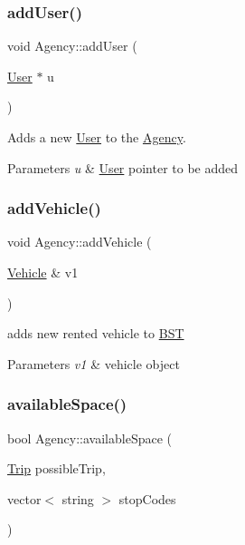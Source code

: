 \subsubsection{\texorpdfstring{add\+User()}{addUser()}}
{\footnotesize\ttfamily void Agency\+::add\+User (\begin{DoxyParamCaption}\item[{\hyperlink{class_user}{User} $\ast$}]{u }\end{DoxyParamCaption})}



Adds a new \hyperlink{class_user}{User} to the \hyperlink{class_agency}{Agency}. 


\begin{DoxyParams}{Parameters}
{\em u} & \hyperlink{class_user}{User} pointer to be added \\
\hline
\end{DoxyParams}
\mbox{\label{group___agency_gab2a08b75fbe909173d539d27a06c7bc9}} 
\subsubsection{\texorpdfstring{add\+Vehicle()}{addVehicle()}}
{\footnotesize\ttfamily void Agency\+::add\+Vehicle (\begin{DoxyParamCaption}\item[{\hyperlink{class_vehicle}{Vehicle} \&}]{v1 }\end{DoxyParamCaption})\hspace{0.3cm}{\ttfamily [inline]}}



adds new rented vehicle to \hyperlink{class_b_s_t}{B\+ST} 


\begin{DoxyParams}{Parameters}
{\em v1} & vehicle object \\
\hline
\end{DoxyParams}
\mbox{\label{group___agency_ga9defb73f53ce32bc6382843dd46fc464}} 
\subsubsection{\texorpdfstring{available\+Space()}{availableSpace()}}
{\footnotesize\ttfamily bool Agency\+::available\+Space (\begin{DoxyParamCaption}\item[{\hyperlink{class_trip}{Trip}}]{possible\+Trip,  }\item[{vector$<$ string $>$}]{stop\+Codes }\end{DoxyParamCaption})}



